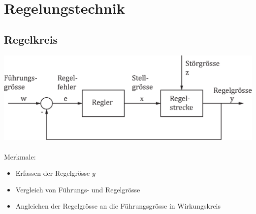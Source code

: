



\chapter{Regelungstechnik}

\section{Regelkreis}
\includegraphics[width = \linewidth]{images/regelkreis.eps}
\\\\
Merkmale:
\begin{itemize}
	\item Erfassen der Regelgrösse $y$
	\item Vergleich von Führungs- und Regelgrösse
	\item Angleichen der Regelgrösse an die Führungsgrösse in Wirkungskreis
\end{itemize}


